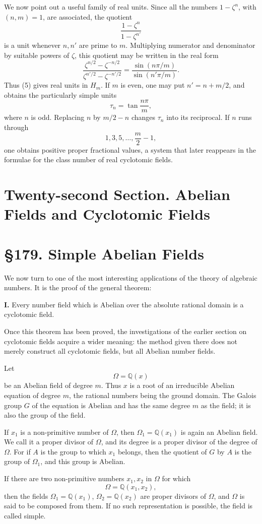 \documentclass[12pt,a4paper]{article}
\newcommand{\webersection}[2]{\clearpage\section*{\S #1. #2}}
\newcommand{\booktitle}[1]{\clearpage\section*{#1}}
\newcommand{\Hm}{H_m}
\newcommand{\zetaS}{\zeta}
\begin{document}
We now point out a useful family of real units.  Since all the numbers \(1-\zetaS^n\), with \((n,m)=1\), are associated, the quotient
\[
  \frac{1-\zetaS^n}{1-\zetaS^{n'}}
\tag{4}
\]
is a unit whenever \(n,n'\) are prime to \(m\).  Multiplying numerator and denominator by suitable powers of \(\zetaS\), this quotient may be written in the real form
\[
  \frac{\zetaS^{n/2}-\zetaS^{-n/2}}{\zetaS^{n'/2}-\zetaS^{-n'/2}}
  =\frac{\sin(n\pi/m)}{\sin(n'\pi/m)}.
\tag{5}
\]
Thus (5) gives real units in \(\Hm\).  If \(m\) is even, one may put \(n'=n+m/2\), and obtains the particularly simple units
\[
  \tau_n=\tan\frac{n\pi}{m},
\tag{6}
\]
where \(n\) is odd.  Replacing \(n\) by \(m/2-n\) changes \(\tau_n\) into its reciprocal.  If \(n\) runs through
\[
  1,3,5,\ldots,\frac m2-1,
\]
one obtains positive proper fractional values, a system that later reappears in the formulae for the class number of real cyclotomic fields.

\booktitle{Twenty-second Section. Abelian Fields and Cyclotomic Fields}

\webersection{179}{Simple Abelian Fields}

We now turn to one of the most interesting applications of the theory of algebraic numbers.  It is the proof of the general theorem:

\textbf{I.} Every number field which is Abelian over the absolute rational domain is a cyclotomic field.

Once this theorem has been proved, the investigations of the earlier section on cyclotomic fields acquire a wider meaning: the method given there does not merely construct all cyclotomic fields, but all Abelian number fields.

Let
\[
  \Omega=\mathbb Q(x)
\]
be an Abelian field of degree \(m\).  Thus \(x\) is a root of an irreducible Abelian equation of degree \(m\), the rational numbers being the ground domain.  The Galois group \(G\) of the equation is Abelian and has the same degree \(m\) as the field; it is also the group of the field.

If \(x_1\) is a non-primitive number of \(\Omega\), then \(\Omega_1=\mathbb Q(x_1)\) is again an Abelian field.  We call it a proper divisor of \(\Omega\), and its degree is a proper divisor of the degree of \(\Omega\).  For if \(A\) is the group to which \(x_1\) belongs, then the quotient of \(G\) by \(A\) is the group of \(\Omega_1\), and this group is Abelian.

If there are two non-primitive numbers \(x_1,x_2\) in \(\Omega\) for which
\[
  \Omega=\mathbb Q(x_1,x_2),
\tag{1}
\]
then the fields \(\Omega_1=\mathbb Q(x_1)\), \(\Omega_2=\mathbb Q(x_2)\) are proper divisors of \(\Omega\), and \(\Omega\) is said to be composed from them.  If no such representation is possible, the field is called simple.
\end{document}
